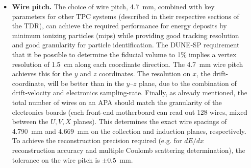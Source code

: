 \begin{itemize}
\item \textbf{Wire pitch.} The choice of wire pitch, \SI{4.7}{mm}, combined with key parameters for other TPC systems (described in their respective sections of the TDR), can achieve the required performance for energy deposits by minimum ionizing particles (mips) while providing good tracking resolution and good granularity for particle identification. The DUNE-SP requirement that it be possible to determine the fiducial volume to 1\% implies a vertex resolution of \SI{1.5}{cm} along each coordinate direction. The \SI{4.7}{mm} wire pitch achieves this for the $y$ and $z$ coordinates.  The resolution on $x$, the drift-coordinate, will be better than in the $y$--$z$ plane, due to the combination of drift-velocity and electronics sampling-rate.  Finally, as already mentioned, the total number of wires on an APA should match the granularity of the electronics boards (each front-end motherboard can read out 128 wires, mixed between the $U,V,X$ planes). This determines the exact wire spacings of \SI{4.790}{mm} and \SI{4.669}{mm} on the collection and induction planes, respectively.  To achieve the reconstruction precision required (e.g. for $dE/dx$ reconstruction accuracy and multiple Coulomb scattering determination), the tolerance on the wire pitch is $\pm$\SI{0.5}{mm}.


\end{itemize}
